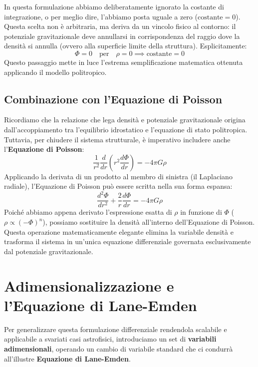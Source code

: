 In questa formulazione abbiamo deliberatamente ignorato la costante di integrazione, o per meglio dire, l'abbiamo posta uguale a zero ($\text{costante} = 0$). Questa scelta non è arbitraria, ma deriva da un vincolo fisico al contorno: il potenziale gravitazionale deve annullarsi in corrispondenza del raggio dove la densità si annulla (ovvero alla superficie limite della struttura). Esplicitamente:
\begin{equation}
\Phi = 0 \quad \text{per} \quad \rho = 0 \implies \text{costante} = 0
\end{equation}
Questo passaggio mette in luce l'estrema semplificazione matematica ottenuta applicando il modello politropico.

\subsection{Combinazione con l'Equazione di Poisson}

Ricordiamo che la relazione che lega densità e potenziale gravitazionale origina dall'accoppiamento tra l'equilibrio idrostatico e l'equazione di stato politropica. Tuttavia, per chiudere il sistema strutturale, è imperativo includere anche l'\textbf{Equazione di Poisson}:
\begin{equation}
\frac{1}{r^2} \frac{d}{dr} \left( r^2 \frac{d\Phi}{dr} \right) = - 4\pi G \rho
\end{equation}
Applicando la derivata di un prodotto al membro di sinistra (il Laplaciano radiale), l'Equazione di Poisson può essere scritta nella sua forma espansa:
\begin{equation}
\frac{d^2\Phi}{dr^2} + \frac{2}{r} \frac{d\Phi}{dr} = - 4\pi G \rho
\end{equation}
Poiché abbiamo appena derivato l'espressione esatta di $\rho$ in funzione di $\Phi$ ($\rho \propto (-\Phi)^n$), possiamo sostituire la densità all'interno dell'Equazione di Poisson. Questa operazione matematicamente elegante elimina la variabile densità e trasforma il sistema in un'unica equazione differenziale governata esclusivamente dal potenziale gravitazionale.

\section{Adimensionalizzazione e l'Equazione di Lane-Emden}

Per generalizzare questa formulazione differenziale rendendola scalabile e applicabile a svariati casi astrofisici, introduciamo un set di \textbf{variabili adimensionali}, operando un cambio di variabile standard che ci condurrà all'illustre \textbf{Equazione di Lane-Emden}.

